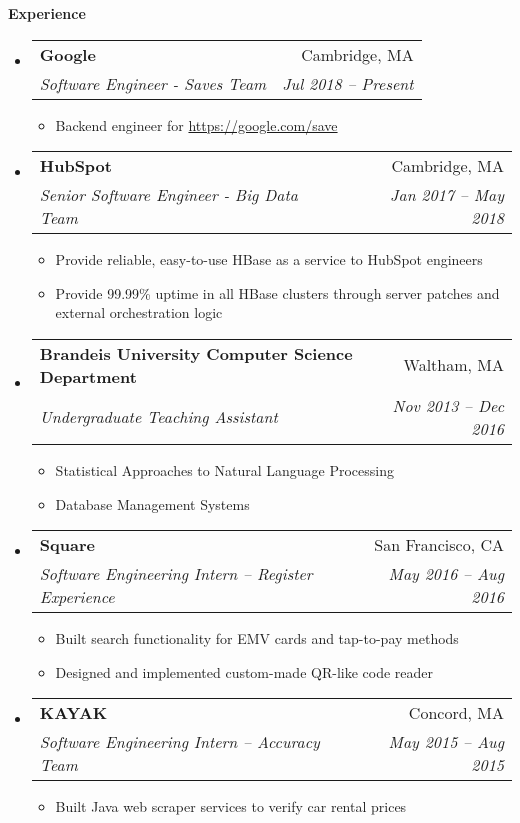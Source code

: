 \documentclass[letterpaper,11pt]{article}
\makeatletter
\newcommand{\resitem}[1]{\item #1 \vspace{-2pt}}
\newcommand{\resheading}[1]{{\large \colorbox{mygrey}{\begin{minipage}{\textwidth}{\textbf{#1 \vphantom{p\^{E}}}}\end{minipage}}}}
\newcommand{\ressubheading}[4]{
\begin{tabular*}{6.5in}{l@{\extracolsep{\fill}}r}
		\textbf{#1} & #2 \\
		\textit{#3} & \textit{#4} \\
\end{tabular*}\vspace{-6pt}}
\makeatother
\begin{document}
\resheading{Experience}
	\begin{itemize}
	
	    \item
            \ressubheading{Google}{Cambridge, MA}
			{Software Engineer - Saves Team}{Jul 2018 -- Present}
			{\footnotesize
    			\begin{itemize}
                    \resitem{Backend engineer for \url{https://google.com/save}}
    			\end{itemize}
	        }
	    \item
            \ressubheading{HubSpot}{Cambridge, MA}
			{Senior Software Engineer - Big Data Team}{Jan 2017 -- May 2018}
			{\footnotesize
    			\begin{itemize}
                    \resitem{Provide reliable, easy-to-use HBase as a service to HubSpot engineers}
                    \resitem{Provide 99.99\% uptime in all HBase clusters through server patches and external orchestration logic}
    			\end{itemize}
			}
	    \item
            \ressubheading{Brandeis University Computer Science Department}{Waltham, MA}
			{Undergraduate Teaching Assistant}{Nov 2013 -- Dec 2016}
			{\footnotesize
    			\begin{itemize}
                    \resitem{Statistical Approaches to Natural Language Processing}
                    \resitem{Database Management Systems}
    			\end{itemize}
			}

		\item
            \ressubheading{Square}{San Francisco, CA}
            {Software Engineering Intern -- Register Experience}{May 2016 -- Aug 2016}
            {\footnotesize
                \begin{itemize}
                    \resitem{Built search functionality for EMV cards and tap-to-pay methods}
                    \resitem{Designed and implemented custom-made QR-like code reader}
                \end{itemize}
            }

	    \item
            \ressubheading{KAYAK}{Concord, MA}
            {Software Engineering Intern -- Accuracy Team}{May 2015 -- Aug 2015}
            {\footnotesize
                \begin{itemize}
                    \resitem{Built Java web scraper services to verify car rental prices}
                \end{itemize}
            }


\end{itemize}
\end{document}
